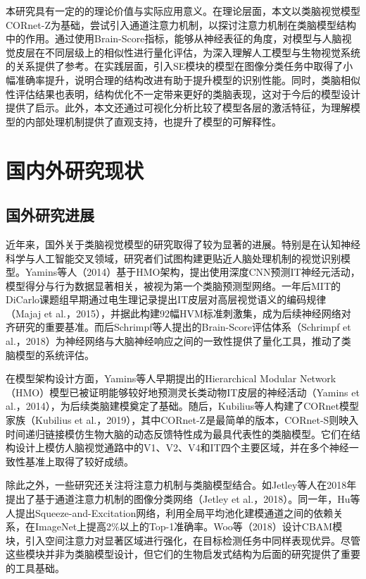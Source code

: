 本研究具有一定的的理论价值与实际应用意义。在理论层面，本文以类脑视觉模型CORnet-Z为基础，尝试引入通道注意力机制，以探讨注意力机制在类脑模型结构中的作用。通过使用Brain-Score指标，能够从神经表征的角度，对模型与人脑视觉皮层在不同层级上的相似性进行量化评估，为深入理解人工模型与生物视觉系统的关系提供了参考。在实践层面，引入SE模块的模型在图像分类任务中取得了小幅准确率提升，说明合理的结构改进有助于提升模型的识别性能。同时，类脑相似性评估结果也表明，结构优化不一定带来更好的类脑表现，这对于今后的模型设计提供了启示。此外，本文还通过可视化分析比较了模型各层的激活特征，为理解模型的内部处理机制提供了直观支持，也提升了模型的可解释性。

\section{国内外研究现状}

\subsection{国外研究进展}

近年来，国外关于类脑视觉模型的研究取得了较为显著的进展。特别是在认知神经科学与人工智能交叉领域，研究者们试图构建更贴近人脑处理机制的视觉识别模型。Yamins等人（2014）基于HMO架构，提出使用深度CNN预测IT神经元活动，模型得分与行为数据显著相关，被视为第一个类脑预测型网络。一年后MIT的DiCarlo课题组早期通过电生理记录提出IT皮层对高层视觉语义的编码规律（Majaj et al.，2015），并据此构建92幅HVM标准刺激集，成为后续神经网络对齐研究的重要基准。而后Schrimpf等人提出的Brain-Score评估体系（Schrimpf et al.，2018）为神经网络与大脑神经响应之间的一致性提供了量化工具，推动了类脑模型的系统评估。

在模型架构设计方面，Yamins等人早期提出的Hierarchical Modular Network（HMO）模型已被证明能够较好地预测灵长类动物IT皮层的神经活动（Yamins et al.，2014），为后续类脑建模奠定了基础。随后，Kubilius等人构建了CORnet模型家族（Kubilius et al.，2019），其中CORnet-Z是最简单的版本，CORnet-S则映入时间递归链接模仿生物大脑的动态反馈特性成为最具代表性的类脑模型。它们在结构设计上模仿人脑视觉通路中的V1、V2、V4和IT四个主要区域，并在多个神经一致性基准上取得了较好成绩。

除此之外，一些研究还关注将注意力机制与类脑模型结合。如Jetley等人在2018年提出了基于通道注意力机制的图像分类网络（Jetley et al.，2018）。同一年，Hu等人提出Squeeze-and-Excitation网络，利用全局平均池化建模通道之间的依赖关系，在ImageNet上提高2\%以上的Top-1准确率。Woo等（2018）设计CBAM模块，引入空间注意力对显著区域进行强化，在目标检测任务中同样表现优异。尽管这些模块并非为类脑模型设计，但它们的生物启发式结构为后面的研究提供了重要的工具基础。

